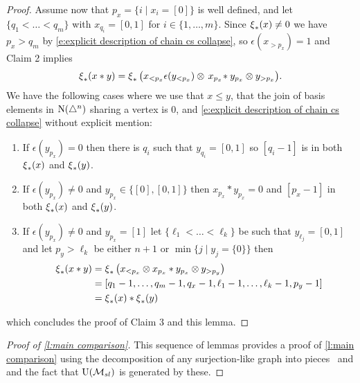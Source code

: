 \begin{proof}
	Assume now that $p_x = \big\{ i \mid x_i = [0] \big\}$ is well defined, and let $\{q_1 < \dots < q_m\}$ with $x_{q_i} = [0,1]$ for $i \in \{1,\dots,m\}$.
	Since $\operatorname{\xi}_\ast(x) \neq 0$ we have $p_x > q_m$ by \eqref{e:explicit description of chain cs collapse}, so $\epsilon(x_{>p_x}) = 1$ and Claim 2 implies
	\[
	\operatorname{\xi}_\ast(x \ast y) =
	\operatorname{\xi}_\ast \big( x_{<p_x} \epsilon(y_{<p_x}) \otimes \, x_{p_x} \! \ast y_{p_x} \otimes y_{>p_x} \big).
	\]
	We have the following cases where we use that $x \leq y$, that the join of basis elements in $\operatorname{N}(\triangle^n)$ sharing a vertex is $0$, and \eqref{e:explicit description of chain cs collapse} without explicit mention:
	\begin{enumerate}
		\item If $\epsilon(y_{p_x}) = 0$ then there is $q_i$ such that $y_{q_i} = [0,1]$ so $[q_i-1]$ is in both $\operatorname{\xi}_\ast(x)$ and $\operatorname{\xi}_\ast(y)$.
		\item If $\epsilon(y_{p_x}) \neq 0$ and $y_{p_x} \in \{[0], [0,1]\}$ then $x_{p_x} \ast y_{p_x} = 0$ and $[p_x-1]$ in both $\operatorname{\xi}_\ast(x)$ and $\operatorname{\xi}_\ast(y)$.
		\item If $\epsilon(y_{p_x}) \neq 0$ and $y_{p_x} = [1]$ let $\{\ell_1 < \dots < \ell_k\}$ be such that $y_{\ell_j} = [0,1]$ and let $p_y > \ell_k$ be either $n+1$ or $\min\{j \mid y_j = \{0\}\}$ then
		\begin{align*}
		\operatorname{\xi}_\ast(x \ast y) & =
		\operatorname{\xi}_\ast \big( x_{< p_x} \otimes x_{p_x} \ast y_{p_x} \otimes y_{> p_y} \big) \\ & =
		[q_1-1, \dots, q_m-1, q_x-1, \ell_1-1, \dots, \ell_k-1, p_y-1] \\ & =
		\operatorname{\xi}_\ast(x) \ast \operatorname{\xi}_\ast(y)
		\end{align*}
	\end{enumerate}
	which concludes the proof of Claim 3 and this lemma.
\end{proof}

\begin{proof}[Proof of \cref{l:main comparison}]
	This sequence of lemmas provides a proof of \cref{l:main comparison} using the decomposition of any surjection-like graph into pieces \coproduct \ and \product and the fact that ${\operatorname{U}(\mathcal{M}_{sl})}$ is generated by these.
\end{proof}